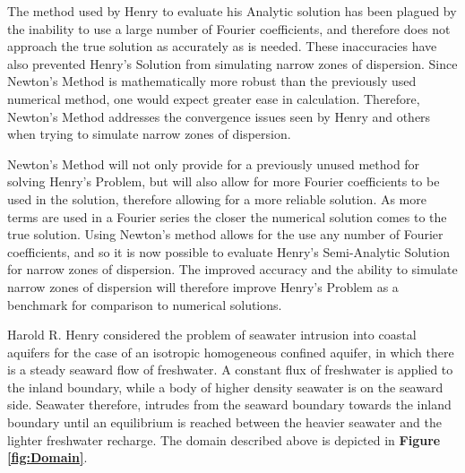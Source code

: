 \documentclass{article}
\begin{document}
The method used by Henry to evaluate his Analytic solution has been plagued by
the inability to use a large number of Fourier coefficients, and therefore does
not approach the true solution as accurately as is needed. These inaccuracies
have also prevented Henry's Solution from simulating narrow zones of
dispersion. Since Newton's Method is mathematically more robust than the
previously used numerical method, one would expect greater ease in calculation.
Therefore, Newton's Method addresses the convergence issues seen by Henry and
 others when trying to simulate narrow zones of dispersion.

Newton's Method will not only provide for a previously unused method for solving
Henry's Problem, but will also allow for more Fourier coefficients to be used in
the solution, therefore allowing for a more reliable solution. As more terms are
used in a Fourier series the closer the numerical solution comes to the true
solution. Using Newton's method allows for the use any number of Fourier
coefficients, and so it is now possible to evaluate Henry's Semi-Analytic
Solution for narrow zones of dispersion. The improved accuracy and the ability
to simulate narrow zones of dispersion will therefore improve Henry's Problem as
a benchmark for comparison to numerical solutions.

Harold R. Henry \cite{Henry60} \cite{Henry64} considered the problem of seawater
intrusion into coastal aquifers for the case of an isotropic homogeneous
confined aquifer, in which there is a steady seaward flow of freshwater. A
constant flux of freshwater is applied to the inland boundary, while a body of
higher density seawater is on the seaward side. Seawater therefore, intrudes
from the seaward boundary towards the inland boundary until an equilibrium is
reached between the heavier seawater and the lighter freshwater recharge. The
domain described above is depicted in \textbf{Figure \ref{fig:Domain}}.
\end{document}
